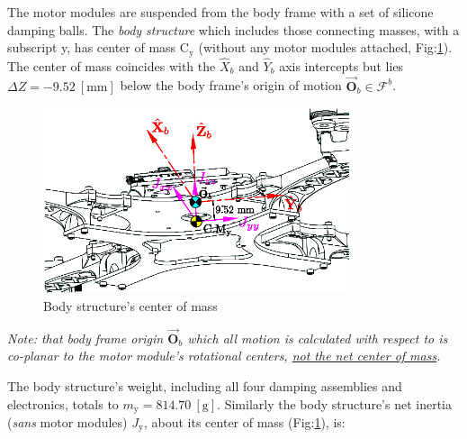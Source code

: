\par
The motor modules are suspended from the body frame with a set of silicone damping balls. The \emph{body structure} which includes those connecting masses, with a subscript y, has center of mass $\text{C}_{\text{y}}$ (without any motor modules attached, Fig:\ref{fig:inertia-center}). The center of mass coincides with the $\hat{X}_b$ and $\hat{Y}_b$ axis intercepts but lies $\Delta Z=-9.52~[\text{mm}]$ below the body frame's origin of motion $\vec{\mathbf{O}}_b\in\mathcal{F}^b$.
\par
\begin{figure}[hbtp]
\vspace{-8pt}
\centering
\includegraphics[width=0.81\textwidth]{figs/inertia-center}
\caption{Body structure's center of mass}
\label{fig:inertia-center}
\vspace{-6pt}
\end{figure}
\par
\emph{\color{Gray}Note: that body frame origin $\vec{\mathbf{O}}_b$ which all motion is calculated with respect to is co-planar to the motor module's rotational centers, \underline{not the net center of mass}.}
\par
The body structure's weight, including all four damping assemblies and electronics, totals to $m_\text{y}=814.70~[\text{g}]$. Similarly the body structure's net inertia (\emph{sans} motor modules) $J_\text{y}$, about its center of mass (Fig:\ref{fig:inertia-center}), is:
